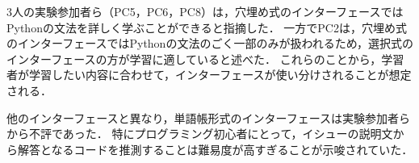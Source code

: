 3人の実験参加者ら（PC5，PC6，PC8）は，穴埋め式のインターフェースではPythonの文法を詳しく学ぶことができると指摘した．
一方でPC2は，穴埋め式のインターフェースではPythonの文法のごく一部のみが扱われるため，選択式のインターフェースの方が学習に適していると述べた．
これらのことから，学習者が学習したい内容に合わせて，インターフェースが使い分けされることが想定される．




他のインターフェースと異なり，単語帳形式のインターフェースは実験参加者らから不評であった．
特にプログラミング初心者にとって，イシューの説明文から解答となるコードを推測することは難易度が高すぎることが示唆されていた．





